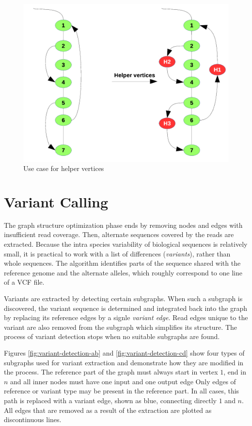\begin{figure}[h]
	\centering
	\includegraphics{img/helper-vertices.pdf}
	\caption{Use case for helper vertices}
	\label{fig:helper-vertices}
\end{figure}

\section{Variant Calling}
\label{sec:variant-calling}

The graph structure optimization phase ends by removing nodes and edges with insufficient read coverage. Then, alternate sequences covered by the reads are extracted. Because the intra species variability of biological sequences is relatively
small, it is practical to work with a list of differences (\textit{variants}), rather than whole sequences. The algorithm identifies parts of the sequence shared with the reference genome and the alternate alleles, which roughly correspond to one line of a VCF file. 

Variants are extracted by detecting certain subgraphs. When such a subgraph is discovered, the variant sequence is determined and integrated back into the graph by replacing its reference edges by a signle \textit{variant edge}. Read edges unique to the variant are also removed from the subgraph which simplifies its structure. The process of variant detection stops when no suitable subgraphs are found.

Figures \ref{fig:variant-detection-ab} and \ref{fig:variant-detection-cd} show four types of subgraphs used for variant extraction and demonstrate how they are modified in the process. The reference part of the graph must always start in vertex $1$, end in $n$ and all inner nodes must have one input and one output edge Only edges of reference or variant type may be present in the reference part. In all cases, this path is replaced with a variant edge, shown as blue, connecting directly $1$ and $n$. All edges that are removed as a result of the extraction are plotted as discontinuous lines.

